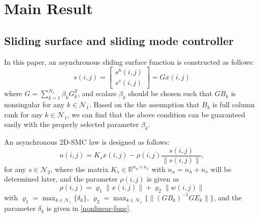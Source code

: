 \documentclass[conference]{IEEEtran}
\begin{document}
\section{Main Result}

\subsection{ Sliding surface and sliding mode controller} \label{sliding-surface}
	In this paper, an asynchronous sliding surface function is constructed as follows: 
	\begin{equation}\label{siding-surface-equation}	
		s(i,j) = \begin{bmatrix}
					s^{h}(i,j)\\
					s^{v}(i,j)
					\end{bmatrix}
			   = Gx(i,j)
	\end{equation}
	where $G=\sum_{k=1}^{N_{1}}\beta_{k}G^{T}_{k}$, and scalars $\beta_{k}$ should be chosen such that $GB_{k}$ is nonsingular for any $k\in\mathcal{N}_{1}$. Based on the the assumption that $B_{k}$ is full column rank for any $k\in\mathcal{N}_{1}$, we can find that the above condition can be guaranteed easily with the properly selected parameter $\beta_{k}$. 
 	
 	An asynchronous 2D-SMC law is designed as follows:
	\begin{equation}\label{smc-law}
		u(i,j) = K_{s}x(i,j)-\rho(i,j)\frac{s(i,j)}{\|s(i,j)\|}, 
	\end{equation}
	for any $s\in\mathcal{N}_{2}$, where the matrix $K_{s}\in\mathbb{R}^{n_u\times n_x}$ with $n_x=n_h+n_v$ will be determined later, and the parameter $\rho(i,j)$ is given as
	\begin{equation}
	\rho(i,j) = \varrho_{1}\|x(i,j)\| + \varrho_{2}\|w(i,j)\|
	\end{equation}
	with $\varrho_{1}=\max_{k\in\mathcal{N}_{1}} \{\delta_{k} \}$, $\varrho_{2} = \max_{k\in\mathcal{N}_{1}}\{\|(GB_{k})^{-1}GE_{k}\| \} $, and the parameter $\delta_{k}$ is given in \eqref{nonlinear-func}. 
	
\end{document}
